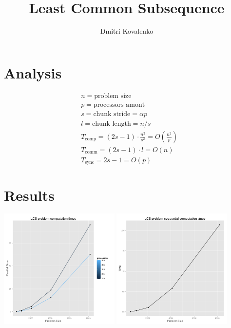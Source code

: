 \documentclass[a4paper]{article}
\begin{document}
\title{Least Common Subsequence}
\author{Dmitri Kovalenko}

\maketitle
\section{Analysis}
\begin{align*}
    &  n = \text{problem size}\\
    &  p = \text{processors amont}\\
    &  s = \text{chunk stride} = \alpha  p\\
    &  l = \text{chunk length} = n/s\\
    &  T_{\text{comp}} = (2s-1) \cdot {\frac{n^2}{s^2}} = O(\frac{n^2}{p})\\
    &  T_{\text{comm}} = (2s-1) \cdot l = O(n)\\
    &  T_{\text{sync}} = 2s-1 = O(p)
\end{align*}

\section{Results}
    \includegraphics[width=0.45\textwidth]{lcs}
    \includegraphics[width=0.45\textwidth]{lcs-seq}
\end{document}
